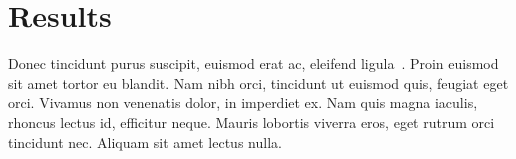 \section{Results}\label{sec:results}
Donec tincidunt purus suscipit, euismod erat ac, eleifend ligula~\cite{chamberlin1976}.
Proin euismod sit amet tortor eu blandit.
Nam nibh orci, tincidunt ut euismod quis, feugiat eget orci.
Vivamus non venenatis dolor, in imperdiet ex.
Nam quis magna iaculis, rhoncus lectus id, efficitur neque.
Mauris lobortis viverra eros, eget rutrum orci tincidunt nec.
Aliquam sit amet lectus nulla.
